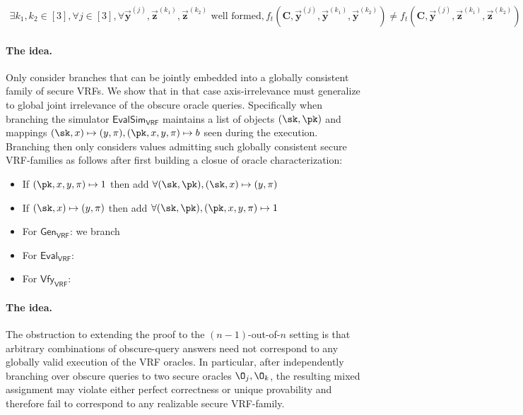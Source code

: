 \documentclass[11pt]{article}
\begin{document}
\begin{align*}
	\exists k_1, k_2 \in [3], \forall j \in [3], \forall \vec{\mathbf y}^{(j)}, \vec{\mathbf z}^{(k_1)}, \vec{\mathbf z}^{(k_2)} \text{ well formed}, f_t(\mathbf C, \vec{\mathbf y}^{(j)}, \vec{\mathbf y}^{(k_1)}, \vec{\mathbf y}^{(k_2)}) \neq f_t(\mathbf C, \vec{\mathbf y}^{(j)}, \vec{\mathbf z}^{(k_1)}, \vec{\mathbf z}^{(k_2)})
\end{align*}

\paragraph{The idea.} Only consider branches that can be jointly embedded into a globally consistent family of secure VRFs. We show that in that case axis-irrelevance must generalize to global joint irrelevance of the obscure oracle queries. Specifically when branching the simulator $\textsf{EvalSim}_{\textsf{VRF}}$ maintains a list of objects $(\sk, \pk)$ and mappings $(\sk, x) \mapsto (y, \pi), (\pk, x, y, \pi) \mapsto b$ seen during the execution. Branching then only considers values admitting such globally consistent secure VRF-families as follows after first building a closue of oracle characterization:

\begin{itemize}
	\item If $(\pk, x, y, \pi) \mapsto 1$ then add $\forall (\sk, \pk), (\sk, x) \mapsto (y, \pi)$
	\item If $(\sk, x) \mapsto (y, \pi)$ then add $\forall (\sk, \pk), (\pk, x, y, \pi) \mapsto 1$
\end{itemize}

\newpage

\begin{itemize}
	\item For $\textsf{Gen}_{\textsf{VRF}}$: we branch 
	\item For $\textsf{Eval}_{\textsf{VRF}}$:
	\item For $\textsf{Vfy}_{\textsf{VRF}}$:
\end{itemize}

\paragraph{The idea.}
The obstruction to extending the proof to the $(n-1)$-out-of-$n$
setting is that arbitrary combinations of obscure-query answers
need not correspond to any globally valid execution of the VRF
oracles. In particular, after independently branching over obscure
queries to two secure oracles $\O_j,\O_k$, the resulting mixed
assignment may violate either perfect correctness or unique
provability and therefore fail to correspond to any realizable
secure VRF-family.
\end{document}
